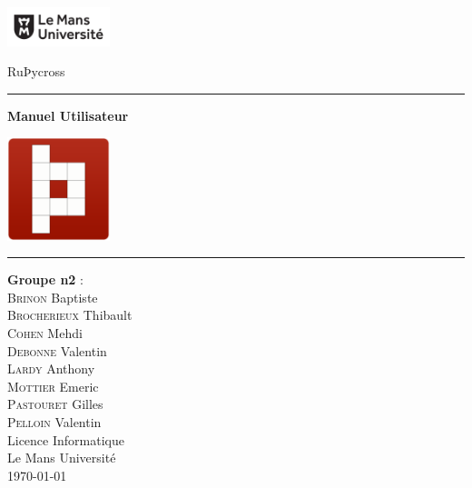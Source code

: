 \documentclass[a4paper, 12pt]{report}
\begin{document}
\begin{titlepage}



	\begin{spacing}{1.5}
			\begin{minipage}{0.4\textwidth}
					\includegraphics[width=3cm]{logo.png}
			\end{minipage}
			\begin{minipage}{0.5\textwidth}\raggedleft
					RuÞycross\\
			\end{minipage}
						\vspace*{\fill}

	\end{spacing}



	\begin{center}
		\begin{spacing}{2}
		    \hrule \vspace{1cm}
			\textbf{\huge Manuel Utilisateur}\\
			\vspace{1cm}
			\begin{minipage}{0.4\textwidth}
					\centerline{\includegraphics[width=3cm]{test_logo_2.png}}
			\end{minipage}
			\vspace{1cm}
			\hrule

			\vspace*{\fill}


		\end{spacing}

		\begin{spacing}{1.15}
			\large\textbf{Groupe n\up{o}2} :\\
			\large
			\textsc{Brinon} Baptiste\\
			\textsc{Brocherieux} Thibault\\
			\textsc{Cohen} Mehdi\\
			\textsc{Debonne} Valentin\\
			\textsc{Lardy} Anthony\\
			\textsc{Mottier} Emeric\\
			\textsc{Pastouret} Gilles\\
			\textsc{Pelloin} Valentin\\
			\vspace*{\fill}
			\textnormal{\large Licence Informatique\\ Le Mans Université\\ \today}
		\end{spacing}
		

\end{center}
\end{titlepage}
\end{document}
